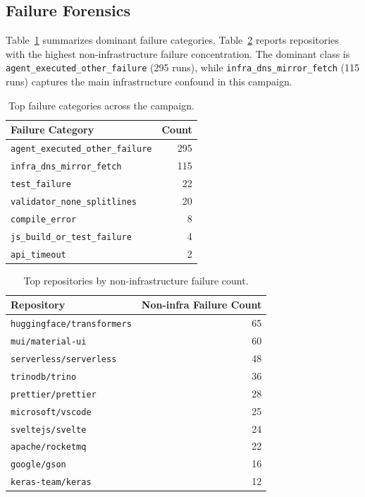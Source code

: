 \subsection{Failure Forensics}
Table~\ref{tab:app-fail-cats} summarizes dominant failure categories. Table~\ref{tab:app-fail-repos} reports repositories with the highest non-infrastructure failure concentration. The dominant class is \texttt{agent\_executed\_other\_failure} (295 runs), while \texttt{infra\_dns\_mirror\_fetch} (115 runs) captures the main infrastructure confound in this campaign.

\begin{table}[ht]
  \centering
  \small
  \begin{tabular}{lr}
    \toprule
    Failure Category & Count \\
    \midrule
    \texttt{agent\_executed\_other\_failure} & 295 \\
    \texttt{infra\_dns\_mirror\_fetch} & 115 \\
    \texttt{test\_failure} & 22 \\
    \texttt{validator\_none\_splitlines} & 20 \\
    \texttt{compile\_error} & 8 \\
    \texttt{js\_build\_or\_test\_failure} & 4 \\
    \texttt{api\_timeout} & 2 \\
    \bottomrule
  \end{tabular}
  \caption{Top failure categories across the campaign.}
  \label{tab:app-fail-cats}
\end{table}

\begin{table}[ht]
  \centering
  \small
  \begin{tabular}{lr}
    \toprule
    Repository & Non-infra Failure Count \\
    \midrule
    \texttt{huggingface/transformers} & 65 \\
    \texttt{mui/material-ui} & 60 \\
    \texttt{serverless/serverless} & 48 \\
    \texttt{trinodb/trino} & 36 \\
    \texttt{prettier/prettier} & 28 \\
    \texttt{microsoft/vscode} & 25 \\
    \texttt{sveltejs/svelte} & 24 \\
    \texttt{apache/rocketmq} & 22 \\
    \texttt{google/gson} & 16 \\
    \texttt{keras-team/keras} & 12 \\
    \bottomrule
  \end{tabular}
  \caption{Top repositories by non-infrastructure failure count.}
  \label{tab:app-fail-repos}
\end{table}

